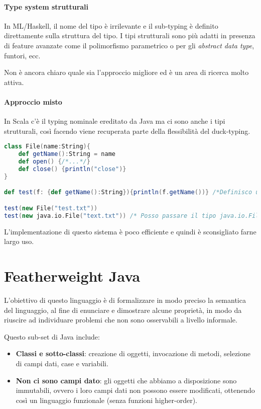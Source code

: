 \paragraph{Type system strutturali} In ML/Haskell, il nome del tipo è irrilevante e il sub-typing è definito direttamente sulla struttura del tipo.
I tipi strutturali sono più adatti in presenza di feature avanzate come il polimorfismo parametrico o per gli \textit{abstract data type}, funtori, ecc.

Non è ancora chiaro quale sia l'approccio migliore ed è un area di ricerca molto attiva.

\paragraph{Approccio misto} In Scala c'è il typing nominale ereditato da Java ma ci sono anche i tipi strutturali, così facendo viene recuperata parte della flessibilità del duck-typing.

\begin{lstlisting}[language=Scala, caption=Typing strutturale in Scala]
class File(name:String){
	def getName():String = name
	def open() {/*...*/}
	def close() {println("close")}
}

def test(f: {def getName():String}){println(f.getName())} /*Definisco un vincolo sulla struttura del tipo*/

test(new File("test.txt"))
test(new java.io.File("text.txt")) /* Posso passare il tipo java.io.File perché ha come metodo getName() */
\end{lstlisting}

\noindent L'implementazione di questo sistema è poco efficiente e quindi è sconsigliato farne largo uso.

\section{Featherweight Java}

L'obiettivo di questo linguaggio è di formalizzare in modo preciso la semantica del linguaggio, al fine di enunciare e dimostrare alcune proprietà, in modo da riuscire ad individuare problemi che non sono osservabili a livello informale.

Questo sub-set di Java include:

\begin{itemize}
	\item \textbf{Classi e sotto-classi}: creazione di oggetti, invocazione di metodi, selezione di campi dati, case e variabili.
	\item \textbf{Non ci sono campi dato}: gli oggetti che abbiamo a disposizione sono immutabili, ovvero i loro campi dati non possono essere modificati, ottenendo così un linguaggio funzionale (senza funzioni higher-order).
\end{itemize}

